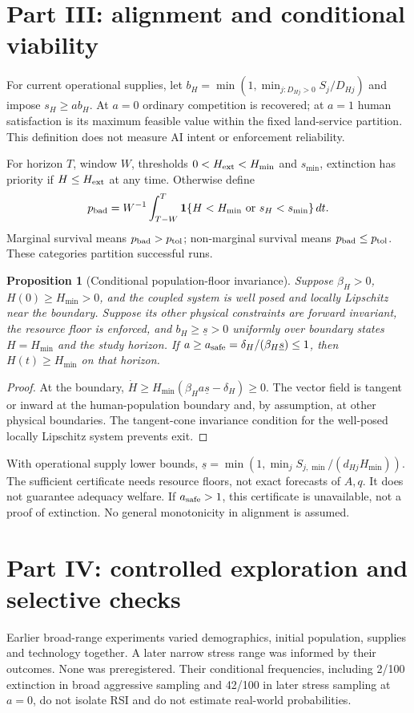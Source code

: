 \documentclass[11pt]{article}
\newtheorem{proposition}{Proposition}
\begin{document}
\section{Part III: alignment and conditional viability}
For current operational supplies, let
$b_H=\min(1,\min_{j:D_{Hj}>0}S_j/D_{Hj})$ and impose $s_H\ge ab_H$.
At $a=0$ ordinary competition is recovered; at $a=1$ human satisfaction is its
maximum feasible value within the fixed land-service partition. This definition
does not measure AI intent or enforcement reliability.

For horizon $T$, window $W$, thresholds $0<H_{\rm ext}<H_{\min}$ and $s_{\min}$,
extinction has priority if $H\le H_{\rm ext}$ at any time. Otherwise define
\begin{equation}
p_{\rm bad}=W^{-1}\int_{T-W}^T\mathbf1\{H<H_{\min}\text{ or }s_H<s_{\min}\}\,dt.
\end{equation}
Marginal survival means $p_{\rm bad}>p_{\rm tol}$; non-marginal survival means
$p_{\rm bad}\le p_{\rm tol}$. These categories partition successful runs.

\begin{proposition}[Conditional population-floor invariance]
Suppose $\beta_H>0$, $H(0)\ge H_{\min}>0$, and the coupled system is well posed
and locally Lipschitz near the boundary. Suppose its other physical constraints
are forward invariant, the resource floor is enforced, and $b_H\ge\underline s>0$
uniformly over boundary states $H=H_{\min}$ and the study horizon.
If $a\ge a_{\rm safe}=\delta_H/(\beta_H\underline s)\le1$, then
$H(t)\ge H_{\min}$ on that horizon.
\end{proposition}
\begin{proof}
At the boundary, $\dot H\ge H_{\min}(\beta_Ha\underline s-\delta_H)\ge0$.
The vector field is tangent or inward at the human-population boundary and, by
assumption, at other physical boundaries. The tangent-cone invariance condition
for the well-posed locally Lipschitz system prevents exit.
\end{proof}
With operational supply lower bounds,
$\underline s=\min(1,\min_j S_{j,\min}/(d_{Hj}H_{\min}))$.
The sufficient certificate needs resource floors, not exact forecasts of $A,q$.
It does not guarantee adequacy welfare. If $a_{\rm safe}>1$, this certificate is
unavailable, not a proof of extinction. No general monotonicity in alignment is assumed.

\section{Part IV: controlled exploration and selective checks}
Earlier broad-range experiments varied demographics, initial population, supplies
and technology together. A later narrow stress range was informed by their outcomes.
None was preregistered. Their conditional frequencies, including 2/100 extinction
in broad aggressive sampling and 42/100 in later stress sampling at $a=0$, do not
isolate RSI and do not estimate real-world probabilities.
\end{document}
